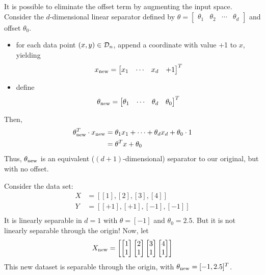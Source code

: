 \documentclass[11pt]{article}
\newcommand\dataTrain{{\cal D}_n}
\begin{document}
It is possible to eliminate the offset term by augmenting the input space. Consider the $d$-dimensional linear separator defined by
$\theta = \begin{bmatrix} \theta_1 & \theta_2 & \cdots
  & \theta_d \end{bmatrix}$ and offset $\theta_0$.
\begin{itemize}
  \item for each data point
  $(x, y) \in \dataTrain$, append a coordinate with value +1 to $x$, yielding
  $$x_{\rm new} = \begin{bmatrix} x_1  & \cdots & x_d & +1 \end{bmatrix}^T$$
  \item define $$\theta_{\rm new} = \begin{bmatrix} \theta_1 & \cdots &
      \theta_d & \theta_0 \end{bmatrix}^T$$
\end{itemize}
Then,
\begin{align*}
  \theta_{\rm new}^T \cdot x_{\rm new} &= \theta_1x_1 + \cdots + \theta_dx_d
    + \theta_0 \cdot 1 \\
    &= \theta^Tx + \theta_0
\end{align*}
Thus, $\theta_{\rm new}$ is an equivalent ($(d+1)$-dimensional) separator to
our original, but with no offset.

Consider the data set:
\begin{align*}
X & = [[1], [2], [3], [4]] \\
Y & = [[+1], [+1], [-1], [-1]] \\
\end{align*}
It is linearly separable in $d = 1$ with $\theta = [-1]$ and $\theta_0
= 2.5$.  But it is not linearly separable through the origin!   Now,
let 
\[X_{\rm new} = \begin{bmatrix}
\begin{bmatrix} 1 \\ 1 \end{bmatrix}
\begin{bmatrix} 2 \\ 1 \end{bmatrix}
\begin{bmatrix} 3 \\ 1 \end{bmatrix}
\begin{bmatrix} 4 \\ 1 \end{bmatrix}
\end{bmatrix}\]
This new dataset is separable through the origin, with $\theta_{\rm
  new} = [-1, 2.5]^T$.
\end{document}
